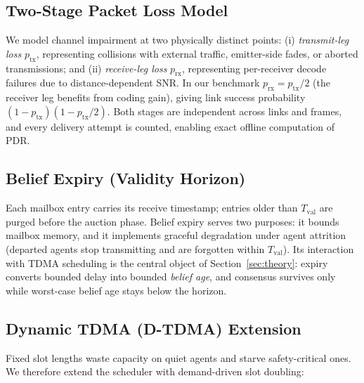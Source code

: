 \subsection{Two-Stage Packet Loss Model}\label{sec:method-loss}
We model channel impairment at two physically distinct points:
(i) \emph{transmit-leg loss} $p_{\mathrm{tx}}$, representing collisions with external traffic, emitter-side fades, or aborted transmissions; and
(ii) \emph{receive-leg loss} $p_{\mathrm{rx}}$, representing per-receiver decode failures due to distance-dependent SNR.
In our benchmark $p_{\mathrm{rx}} = p_{\mathrm{tx}}/2$ (the receiver leg benefits from coding gain), giving link success probability $(1-p_{\mathrm{tx}})(1-p_{\mathrm{tx}}/2)$.
Both stages are independent across links and frames, and every delivery attempt is counted, enabling exact offline computation of PDR.

\subsection{Belief Expiry (Validity Horizon)}\label{sec:method-belief}
Each mailbox entry carries its receive timestamp; entries older than $T_{\mathrm{val}}$ are purged before the auction phase.
Belief expiry serves two purposes: it bounds mailbox memory, and it implements graceful degradation under agent attrition (departed agents stop transmitting and are forgotten within $T_{\mathrm{val}}$).
Its interaction with TDMA scheduling is the central object of Section~\ref{sec:theory}: expiry converts bounded delay into bounded \emph{belief age}, and consensus survives only while worst-case belief age stays below the horizon.
\subsection{Dynamic TDMA (D-TDMA) Extension}\label{sec:dtdma}
Fixed slot lengths waste capacity on quiet agents and starve safety-critical ones.
We therefore extend the scheduler with demand-driven slot doubling:


